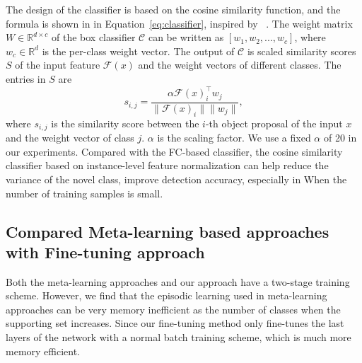  The design of the classifier is based on the cosine similarity function, and the formula is shown in in Equation~\ref{eq:classifier}, inspired by ~\citet{gidaris2018dynamic,qi2018low,chen2019closer}. 
The weight matrix $W\in\mathbb{R}^{d\times c}$ of the box classifier $\mathcal{C}$ can be written as $[w_1, w_2, ..., w_c]$, where $w_c\in\mathbb{R}^d$ is the per-class weight vector. The output of $\mathcal{C}$ is scaled similarity scores $S$ of the input feature $\mathcal{F}(x)$ and the weight vectors of different classes. The entries in $S$ are 
\begin{equation}
    s_{i,j} = \frac{\alpha \mathcal{F}(x)_i^\top w_j}{\|\mathcal{F}(x)_i\| \|w_j\|},
    \label{eq:classifier} 
\end{equation}
where $s_{i,j}$ is the similarity score between the $i$-th object proposal of the input $x$ and the weight vector of class $j$. $\alpha$ is the scaling factor. We use a fixed $\alpha$ of 20 in our experiments.
Compared with the FC-based classifier, the cosine similarity classifier based on instance-level feature normalization can help reduce the variance of the novel class, improve detection accuracy, especially in When the number of training samples is small.

\subsection{Compared Meta-learning based approaches with Fine-tuning approach}
\label{sec:meta}
Both the meta-learning approaches and our approach have a two-stage 
training scheme. However, we find that the episodic learning used in meta-learning approaches 
can be very memory inefficient as the number of classes when the supporting set increases. Since our
fine-tuning method only fine-tunes the last layers of the network with a normal batch training scheme, which is much more memory efficient. 
